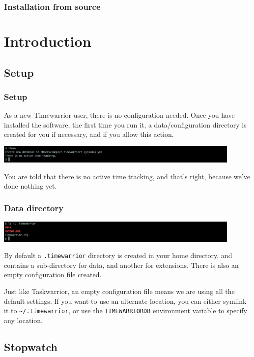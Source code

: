 \documentclass[t,handout]{beamer}
\begin{document}
\begin{frame}[fragile]\frametitle{Installation from source}
\end{frame}

\section{Introduction}

\subsection{Setup}

\begin{frame}[fragile]\frametitle{Setup}
    As a new Timewarrior user, there is no configuration needed. Once you have installed the software, the first time you run it, a data/configuration directory is created for you if necessary, and if you allow this action.

    \includegraphics[width=12cm]{images/tutorial1.png}

    You are told that there is no active time tracking, and that's right, because we've done nothing yet.
\end{frame}

\begin{frame}[fragile]\frametitle{Data directory}
    \includegraphics[width=12cm]{images/tutorial2.png}

    By default a \verb=.timewarrior= directory is created in your home directory, and contains a sub-directory for data, and another for extensions. There is also an empty configuration file created.

    Just like Taskwarrior, an empty configuration file means we are using all the default settings. If you want to use an alternate location, you can either symlink it to \verb=~/.timewarrior=, or use the \verb=TIMEWARRIORDB= environment variable to specify any location.
\end{frame}

\subsection{Stopwatch}
\end{document}

